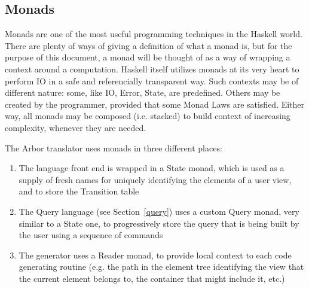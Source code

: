 \documentclass[12pt]{article} %
\newcommand{\fe}{front end}
\newcommand{\A}{Arbor}
\newcommand{\Hs}{Haskell}
\begin{document}
\subsection{Monads}\label{monads}
Monads are one of the most useful programming techniques in the \Hs{} world. There are plenty of ways of giving a definition of what a monad is, but for the purpose of this document, a monad will be thought of as a way of wrapping a context around a computation. Haskell itself utilizes monads at its very heart to perform IO in a safe and referencially transparent way. Such contexts may be of different nature: some, like IO, Error, State, are predefined. Others may be created by the programmer, provided that some Monad Laws are satisfied. Either way, all monads may be composed (i.e. stacked) to build context of increasing complexity, whenever they are needed.

The \A{} translator uses monads in three different places:
\begin{enumerate}
\item The language \fe{} is wrapped in a State monad, which is used as a supply of fresh names for uniquely identifying the elements of a user view, and to store the Transition table
\item The Query language (see Section~\ref{query}) uses a custom Query monad, very similar to a State one, to progressively store the query that is being built by the user using a sequence of commands
\item The generator uses a Reader monad, to provide local context to each code generating routine (e.g. the path in the element tree identifying the view that the current element belongs to, the container that might include it, etc.)
\end{enumerate}
\end{document}
